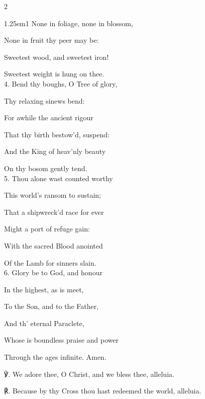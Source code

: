 \begin{paracol}{2}
\begin{hangparas}{1.25em}{1}
None in foliage, none in blossom,

None in fruit thy peer may be:

Sweetest wood, and sweetest iron!

Sweetest weight is hung on thee.\\

4. Bend thy boughs, O Tree of glory,

Thy relaxing sinews bend:

For awhile the ancient rigour

That thy birth bestow'd, suspend:

And the King of heav'nly beauty

On thy bosom gently tend.\\

5. Thou alone wast counted worthy

This world's ransom to sustain;

That a shipwreck'd race for ever

Might a port of refuge gain:

With the sacred Blood anointed

Of the Lamb for sinners slain.\\

6. Glory be to God, and honour

In the highest, as is meet,

To the Son, and to the Father,

And th' eternal Paraclete,

Whose is boundless praise and power

Through the ages infinite. Amen.\\
\end{hangparas}

℣. We adore thee, O Christ, and we bless thee, alleluia.

℟. Because by thy Cross thou hast redeemed the world, alleluia.


\fussy	
\end{paracol}



